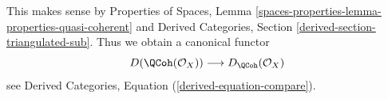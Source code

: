 \noindent
This makes sense by
Properties of Spaces, Lemma
\ref{spaces-properties-lemma-properties-quasi-coherent}
and
Derived Categories, Section \ref{derived-section-triangulated-sub}.
Thus we obtain a canonical functor
\begin{equation}
\label{equation-compare}
D(\QCoh(\mathcal{O}_X))
\longrightarrow
D_\QCoh(\mathcal{O}_X)
\end{equation}
see Derived Categories, Equation (\ref{derived-equation-compare}).